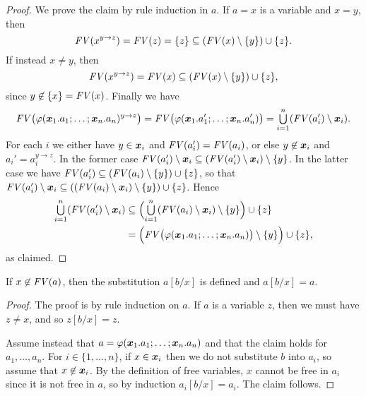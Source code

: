 \documentclass[a4paper, 11pt, article, danish, oneside]{memoir}
\DeclarePairedDelimiter{\auxdelimparen}{(}{)}
\newcommand*\union\cup
\DeclareMathOperator*{\smallbigcup}{\textstyle\bigcup}
\DeclareMathOperator*{\bigunion}{\mathchoice
    {\smallbigcup}%
    {\bigcup}%
    {\bigcup}%
    {\bigcup}%
}
\renewcommand{\phi}{\varphi}
\newcommand{\freevar}[2][]{\mathit{FV}\auxdelimparen[#1]{#2}}
\begin{document}
\begin{proof}
    We prove the claim by rule induction in $a$. If $a = x$ is a variable and $x = y$, then
    \begin{equation*}
        \freevar{x^{y \to z}}
            = \freevar{z}
            = \{z\}
            \subseteq (\freevar{x} \setminus \{y\}) \union \{z\}.
    \end{equation*}
    If instead $x \neq y$, then
    \begin{equation*}
        \freevar{x^{y \to z}}
            = \freevar{x}
            \subseteq (\freevar{x} \setminus \{y\}) \union \{z\},
    \end{equation*}
    since $y \not\in \{x\} = \freevar{x}$. Finally we have
    \begin{equation*}
        \freevar[\big]{\phi(\seq{x}_1.a_1 ; \ldots ; \seq{x}_n.a_n)^{y \to z}}
            = \freevar[\big]{\phi(\seq{x}_1.a_1' ; \ldots ; \seq{x}_n.a_n')}
            = \bigunion_{i=1}^n (\freevar{a_i'} \setminus \seq{x}_i).
    \end{equation*}
    For each $i$ we either have $y \in \bm{x}_i$ and $\freevar{a_i'} = \freevar{a_i}$, or else $y \not\in \bm{x}_i$ and $a_i' = a_i^{y \to z}$. In the former case $\freevar{a_i'} \setminus \seq{x}_i \subseteq (\freevar{a_i'} \setminus \seq{x}_i) \setminus \{y\}$. In the latter case we have $\freevar{a_i'} \subseteq (\freevar{a_i} \setminus \{y\}) \union \{z\}$, so that $\freevar{a_i'} \setminus \seq{x}_i \subseteq ((\freevar{a_i} \setminus \seq{x}_i) \setminus \{y\}) \union \{z\}$. Hence
    \begin{align*}
        \bigunion_{i=1}^n (\freevar{a_i'} \setminus \seq{x}_i)
            &\subseteq \Bigl(\bigunion_{i=1}^n (\freevar{a_i} \setminus \seq{x}_i) \setminus \{y\} \Bigr) \union \{z\} \\
            &= \Bigl( \freevar[\big]{\phi(\seq{x}_1.a_1 ; \ldots ; \seq{x}_n.a_n)} \setminus \{y\} \Bigr) \union \{z\},
    \end{align*}
    as claimed.
\end{proof}


\begin{lemma}
    \label{lem:substitution-not-free}
    If $x \not\in \freevar{a}$, then the substitution $a[b/x]$ is defined and $a[b/x] = a$.
\end{lemma}

\begin{proof}
    The proof is by rule induction on $a$. If $a$ is a variable $z$, then we must have $z \neq x$, and so $z[b/x] = z$.

    Assume instead that $a = \phi(\seq{x}_1.a_1 ; \ldots ; \seq{x}_n.a_n)$ and that the claim holds for $a_1, \ldots, a_n$. For $i \in \{1, \ldots, n\}$, if $x \in \bm{x}_i$ then we do not substitute $b$ into $a_i$, so assume that $x \not\in \bm{x}_i$. By the definition of free variables, $x$ cannot be free in $a_i$ since it is not free in $a$, so by induction $a_i[b/x] = a_i$. The claim follows.
\end{proof}
\end{document}
